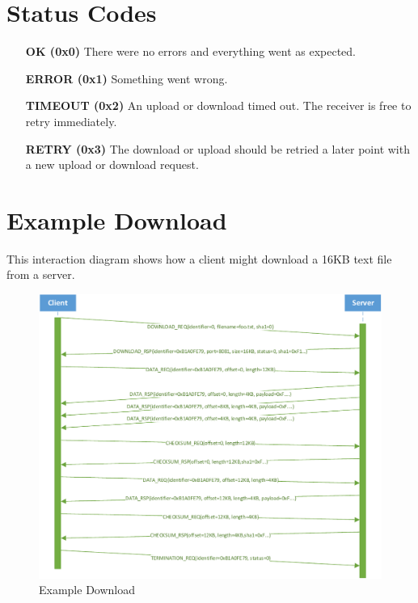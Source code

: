 \documentclass[]{article}
\begin{document}
\section{Status Codes}
\label{STATUS-CODES}

\begin{itemize}
\item[\textbf{OK (0x0)}] There were no errors and everything went as expected. 
\item[\textbf{ERROR (0x1)}] Something went wrong.
\item[\textbf{TIMEOUT (0x2)}] An upload or download timed out. The receiver is free to retry immediately.
\item[\textbf{RETRY (0x3)}] The download or upload should be retried a later point with a new upload or download request.
\end{itemize}

\newpage

\section{Example Download}
This interaction diagram shows how a client might download a 16KB text file from a server.

\begin{figure}[H]
\centering
\includegraphics[width=\textwidth]{frames/download-interaction.pdf}
\caption{Example Download}
\label{EXAMPLE-DOWNLOAD}
\end{figure}
\end{document}
